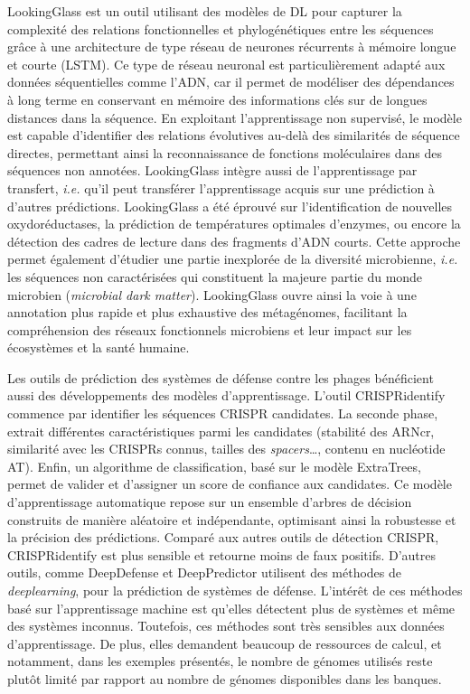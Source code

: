 LookingGlass \cite{hoarfrost_deep_2022} est un outil utilisant des modèles de DL pour capturer la complexité des relations fonctionnelles et phylogénétiques entre les séquences grâce à une architecture de type réseau de neurones récurrents à mémoire longue et courte (LSTM). Ce type de réseau neuronal est particulièrement adapté aux données séquentielles comme l’ADN, car il permet de modéliser des dépendances à long terme en conservant en mémoire des informations clés sur de longues distances dans la séquence. En exploitant l’apprentissage non supervisé, le modèle est capable d’identifier des relations évolutives au-delà des similarités de séquence directes, permettant ainsi la reconnaissance de fonctions moléculaires dans des séquences non annotées. LookingGlass intègre aussi de l'apprentissage par transfert, \textit{i.e.} qu'il peut transférer l'apprentissage acquis sur une prédiction à d'autres prédictions. LookingGlass a été éprouvé sur l'identification de nouvelles oxydoréductases, la prédiction de températures optimales d’enzymes, ou encore la détection des cadres de lecture dans des fragments d’ADN courts. Cette approche permet également d'étudier une partie inexplorée de la diversité microbienne, \textit{i.e.} les séquences non caractérisées qui constituent la majeure partie du monde microbien (\textit{microbial dark matter}). LookingGlass ouvre ainsi la voie à une annotation plus rapide et plus exhaustive des métagénomes, facilitant la compréhension des réseaux fonctionnels microbiens et leur impact sur les écosystèmes et la santé humaine.

Les outils de prédiction des systèmes de défense contre les phages bénéficient aussi des développements des modèles d'apprentissage. L'outil CRISPRidentify\cite{mitrofanov_crispridentify_2021} commence par identifier les séquences CRISPR candidates. La seconde phase, extrait différentes caractéristiques parmi les candidates (stabilité des ARNcr, similarité avec les CRISPRs connus, tailles des \textit{spacers}\dots, contenu en nucléotide AT). Enfin, un algorithme de classification, basé sur le modèle ExtraTrees, permet de valider et d'assigner un score de confiance aux candidates. Ce modèle d'apprentissage automatique repose sur un ensemble d'arbres de décision construits de manière aléatoire et indépendante, optimisant ainsi la robustesse et la précision des prédictions. Comparé aux autres outils de détection CRISPR, CRISPRidentify est plus sensible et retourne moins de faux positifs. D'autres outils, comme DeepDefense \cite{hauns_deepdefense_2024} et DeepPredictor\cite{hauns_deepdefense_2024} utilisent des méthodes de \textit{deeplearning}, pour la prédiction de systèmes de défense. L'intérêt de ces méthodes basé sur l'apprentissage machine est qu'elles détectent plus de systèmes et même des systèmes inconnus. Toutefois, ces méthodes sont très sensibles aux données d'apprentissage. De plus, elles demandent beaucoup de ressources de calcul, et notamment, dans les exemples présentés, le nombre de génomes utilisés reste plutôt limité par rapport au nombre de génomes disponibles dans les banques.